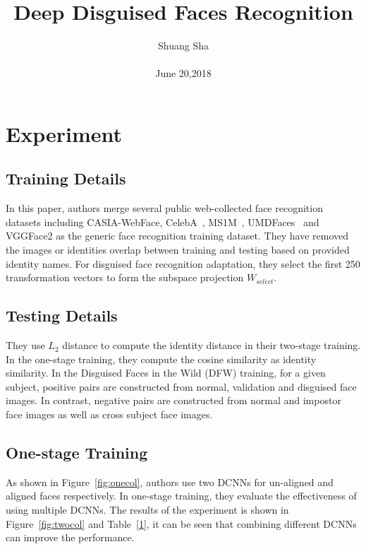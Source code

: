 \documentclass[10pt,twocolumn,letterpaper]{article}
\begin{document}
\title{Deep Disguised Faces Recognition}

\author{Shuang Sha \\\\ June 20,2018}

\maketitle


\section{Experiment}
\subsection{Training Details}


In this paper, authors merge several public web-collected face recognition datasets including CASIA-WebFace, CelebA~\cite{liu2015deep}, MS1M~\cite{guo2016ms}, UMDFaces~\cite{bansal2017umdfaces} and VGGFace2 as the generic face recognition training dataset. They have removed the images or identities overlap between training and testing based on provided identity names. For disguised face recognition adaptation, they select the first 250 transformation vectors to form the subspace projection $W_{select}$.


\subsection{Testing Details}

They use $L_2$ distance to compute the identity distance in their two-stage training. In the one-stage training, they compute the cosine similarity as identity similarity. In the Disguised Faces in the Wild (DFW) training, for a given subject, positive pairs are constructed from normal, validation and disguised face images. In contrast, negative pairs are constructed from normal and impostor face images as well as cross subject face images.

\subsection{One-stage Training}

As shown in Figure~\ref{fig:onecol}, authors use two DCNNs for un-aligned and aligned faces respectively. In one-stage training, they evaluate the effectiveness of using multiple DCNNs. The results of the experiment is shown in Figure~\ref{fig:twocol} and Table~\ref{1}, it can be seen that combining different DCNNs can improve the performance.
\end{document}

